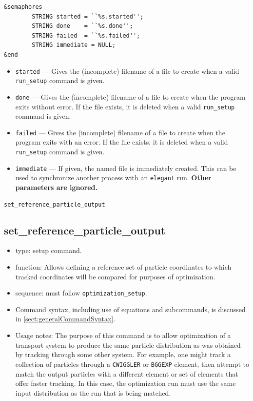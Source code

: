 \documentclass[11pt]{article}
\begin{document}
\begin{verbatim}
&semaphores
        STRING started = ``%s.started'';
        STRING done    = ``%s.done'';
        STRING failed  = ``%s.failed'';
        STRING immediate = NULL;
&end
\end{verbatim}

\begin{itemize}
\item {\tt started} --- Gives the (incomplete) filename of a file to create when a valid
        {\tt run\_setup} command is given.
\item {\tt done} --- Gives the (incomplete) filename of a file to create when the program
        exits without error.  If the file exists, it is deleted when a valid {\tt run\_setup}
        command is given.
\item {\tt failed} --- Gives the (incomplete) filename of a file to create when the program
        exits with an error.  If the file exists, it is deleted when a valid {\tt run\_setup}
        command is given.
\item {\tt immediate} --- If given, the named file is immediately created. This can be used to synchronize
  another process with an {\tt elegant} run. {\bf Other parameters are ignored.}
\end{itemize}

\newpage
\begin{center}{\Large\verb|set_reference_particle_output|}\end{center}
\subsection{set\_reference\_particle\_output \label{subsec:setreferenceparticleoutput}}

\begin{itemize}
\item type: setup command.
\item function: Allows defining a reference set of particle coordinates
  to which tracked coordinates will be compared for purposes of optimization.
\item sequence: must follow \verb|optimization_setup|.
\item Command syntax, including use of equations and subcommands, is discussed in \ref{sect:generalCommandSyntax}.
\item Usage notes: The purpose of this command is to allow optimization of a transport system to produce the same
  particle distribution as was obtained by tracking through some other system. For example, one might track a 
  collection of particles through a \verb|CWIGGLER| or \verb|BGGEXP| element, then attempt to match the output 
  particles with a different element or set of elements that offer faster tracking.
  In this case, the optimization run must use the same input distribution as the run that is being matched.
\end{itemize}
\end{document}
